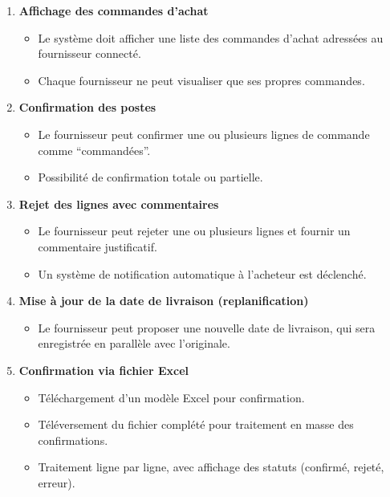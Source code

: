 \documentclass[12pt,a4paper,oneside]{report}
\begin{document}
\begin{enumerate}
  \item \textbf{Affichage des commandes d'achat}
  \begin{itemize}[label=\textbullet]
    \item Le système doit afficher une liste des commandes d'achat adressées au fournisseur connecté.
    \item Chaque fournisseur ne peut visualiser que ses propres commandes.
  \end{itemize}

  \item \textbf{Confirmation des postes}
  \begin{itemize}[label=\textbullet]
    \item Le fournisseur peut confirmer une ou plusieurs lignes de commande comme ``commandées''.
    \item Possibilité de confirmation totale ou partielle.
  \end{itemize}

  \item \textbf{Rejet des lignes avec commentaires}
  \begin{itemize}[label=\textbullet]
    \item Le fournisseur peut rejeter une ou plusieurs lignes et fournir un commentaire justificatif.
    \item Un système de notification automatique à l'acheteur est déclenché.
  \end{itemize}

  \item \textbf{Mise à jour de la date de livraison (replanification)}
  \begin{itemize}[label=\textbullet]
    \item Le fournisseur peut proposer une nouvelle date de livraison, qui sera enregistrée en parallèle avec l'originale.
  \end{itemize}

  \item \textbf{Confirmation via fichier Excel}
  \begin{itemize}[label=\textbullet]
    \item Téléchargement d'un modèle Excel pour confirmation.
    \item Téléversement du fichier complété pour traitement en masse des confirmations.
    \item Traitement ligne par ligne, avec affichage des statuts (confirmé, rejeté, erreur).
  \end{itemize}


\end{enumerate}
\end{document}
